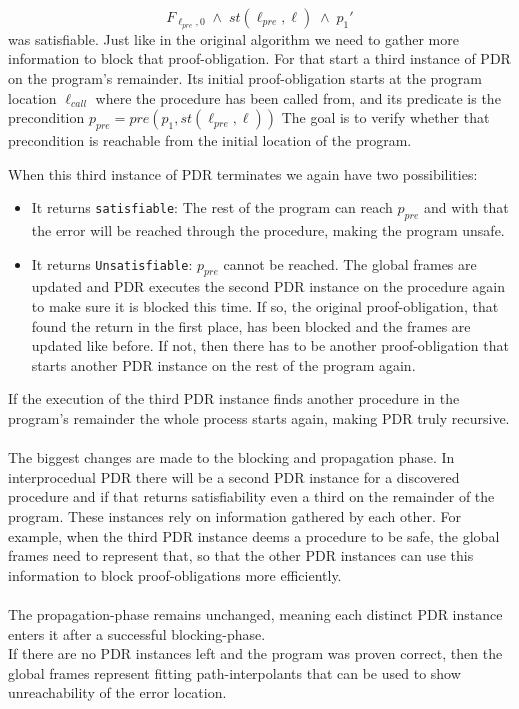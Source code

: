 \documentclass{article}
\begin{document}
	\begin{equation}
		F_{\ell_{pre}, 0} \; \land \; st(\ell_{pre}, \ell) \; \land \; p_1'
	\end{equation}
	was satisfiable. Just like in the original algorithm we need to gather more information to block that proof-obligation. For that start a third instance of PDR on the program's remainder. Its initial proof-obligation starts at the program location $\ell_{call}$ where the procedure has been called from, and its predicate is the precondition $p_{pre} = pre(p_1, st(\ell_{pre}, \ell))$
	The goal is to verify whether that precondition is reachable from the initial location of the program. \\ \par
	When this third instance of PDR terminates we again have two possibilities: 
	\begin{itemize}
		\item It returns \texttt{satisfiable}: The rest of the program can reach $p_{pre}$ and with that the error will be reached through the procedure, making the program unsafe.
		\item It returns \texttt{Unsatisfiable}: $p_{pre}$ cannot be reached. The global frames are updated and PDR executes the second PDR instance on the procedure again to make sure it is blocked this time. If so, the original proof-obligation, that found the return in the first place, has been blocked and the frames are updated like before. If not, then there has to be another proof-obligation that starts another PDR instance on the rest of the program again.
	\end{itemize}
	If the execution of the third PDR instance finds another procedure in the program's remainder the whole process starts again, making PDR truly recursive. \\ \\
	
	The biggest changes are made to the blocking and propagation phase. In interprocedual PDR there will be a second PDR instance for a discovered procedure and if that returns satisfiability even a third on the remainder of the program. These instances rely on information gathered by each other. For example, when the third PDR instance deems a procedure to be safe, the global frames need to represent that, so that the other PDR instances can use this information to block proof-obligations more efficiently. \\ \\
	The propagation-phase remains unchanged, meaning each distinct PDR instance enters it after a successful blocking-phase. \\
	If there are no PDR instances left and the program was proven correct, then the global frames represent fitting path-interpolants that can be used to show unreachability of the error location.
	
\end{document}
